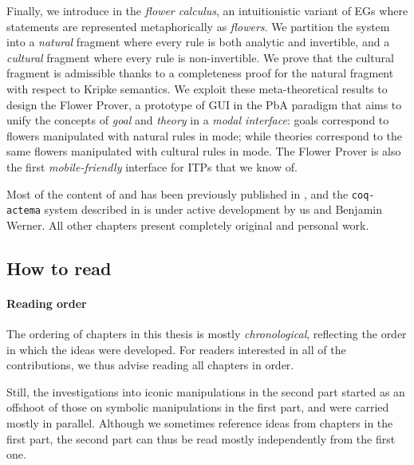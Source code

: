 \begin{description}
  Finally, we introduce in  the \emph{flower calculus}, an
  intuitionistic variant of EGs where statements are represented metaphorically
  as \emph{flowers}. We partition the system into a \emph{natural} fragment
  where every rule is both analytic and invertible, and a \emph{cultural}
  fragment where every rule is non-invertible. We prove that the cultural
  fragment is admissible thanks to a completeness proof for the natural fragment
  with respect to Kripke semantics. We exploit these meta-theoretical results to
  design the Flower Prover, a prototype of GUI in the PbA paradigm that aims to
  unify the concepts of \emph{goal} and \emph{theory} in a \emph{modal
  interface}: goals correspond to flowers manipulated with natural rules in
  \Proof mode; while theories correspond to the same flowers manipulated with
  cultural rules in \Edit mode. The Flower Prover is also the first
  \emph{mobile-friendly} interface for ITPs that we know of.
\end{description}

\begin{kaonote}
Most of the content of  and  has been previously published
in \cite{10.1145/3497775.3503692}, and the \texttt{coq-actema} system described
in  is under active development by us and Benjamin Werner. All
other chapters present completely original and personal work.
\end{kaonote}

\subsection{How to read}

\paragraph{Reading order}

The ordering of chapters in this thesis is mostly \emph{chronological},
reflecting the order in which the ideas were developed. For readers interested
in all of the contributions, we thus advise reading all chapters in order.

Still, the investigations into iconic manipulations in the second part started
as an offshoot of those on symbolic manipulations in the first part, and were
carried mostly in parallel. Although we sometimes reference ideas from chapters
in the first part, the second part can thus be read mostly independently from
the first one.

